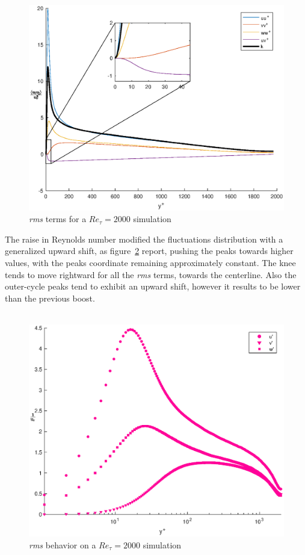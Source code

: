 \begin{figure}
\begin{center}
\includegraphics[scale=0.55]{grafici/budget+k_2000.eps}
\caption{\emph{rms} terms for a $Re_{\tau}=2000$ simulation}
\label{budget:2000}
\end{center} 
\end{figure}


The raise in Reynolds number modified the fluctuations distribution with a generalized upward shift, as figure~\ref{rms:2000} report, pushing the peaks towards higher values, with the peaks coordinate remaining approximately constant. The knee tends to move rightward for all the \emph{rms} terms, towards the centerline. Also the outer-cycle peaks tend to exhibit an upward shift, however it results to be lower than the previous boost.\\~\par

\begin{figure}
\begin{center}
\includegraphics[scale=0.55]{grafici/rms_2000.eps}
\caption{\emph{rms} behavior on a $Re_{\tau}=2000$ simulation}
\label{rms:2000}
\end{center} 
\end{figure}

